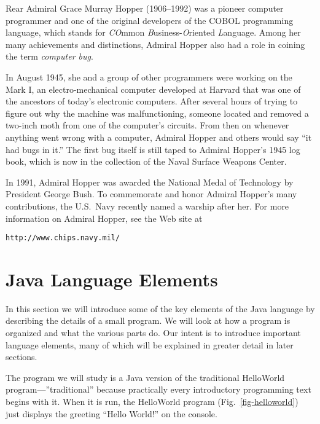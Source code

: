 {\color{cyan}Rear Admiral} Grace Murray Hopper (1906--1992) was a
pioneer computer programmer and one of the original developers of the
COBOL programming language, which stands for {\it CO}mmon {\it
B}usiness-{\it O}riented {\it L}anguage.  Among her many achievements
and distinctions, Admiral Hopper also had a role in coining the term
{\it computer bug}.

In August 1945, she and a group of other programmers were working on
the Mark I, an electro-mechanical computer developed at Harvard that
was one of the ancestors of today's electronic computers.  After
several hours of trying to figure out why the machine was
malfunctioning, someone located and removed a two-inch moth from one
of the computer's circuits.  From then on whenever anything went wrong
with a computer, Admiral Hopper and others would say ``it had bugs in
it.''  The first bug itself is still taped to Admiral Hopper's 1945
log book, which is now in the collection of the Naval Surface Weapons
Center.

In 1991, Admiral Hopper was awarded the National Medal of Technology
by President George Bush.  To commemorate and honor Admiral Hopper's
many contributions, the U.S.~Navy recently named a warship after her.
For more information on Admiral Hopper, see the Web site at

\WWWleft
\begin{jjjlisting}
\begin{lstlisting}[commentstyle=\color{black}\small]
http://www.chips.navy.mil/
\end{lstlisting}
\end{jjjlisting}


\section{Java Language Elements}

\noindent In this section we will introduce some of the key elements 
of the Java language by describing the details of a small program.  We
will look at how a program is organized and what the various parts
do. Our intent is to introduce important language elements, many of
which will be explained in greater detail in later sections.

The program we will study is a Java version of the traditional
HelloWorld program---''traditional'' because practically every
introductory programming text begins with it. When it is run, the
HelloWorld program (Fig.~\ref{fig-helloworld}) just displays the
greeting ``Hello World!'' on the console.

